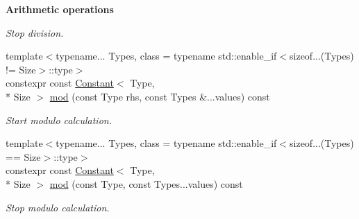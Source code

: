 \begin{Indent}{\bf Arithmetic operations}
\begin{DoxyCompactItemize}
\begin{DoxyCompactList}\small\item\em Stop division. \end{DoxyCompactList}\item 
{\footnotesize template$<$typename... Types, class  = typename std\-::enable\-\_\-if$<$sizeof...(\-Types) != Size$>$\-::type$>$ }\\constexpr const \hyperlink{exceptionmagrathea_1_1Constant}{Constant}$<$ Type, \\*
Size $>$ \hyperlink{exceptionmagrathea_1_1Constant_a8930610422c915ea40c9d33000b40c7a}{mod} (const Type rhs, const Types \&...values) const 
\begin{DoxyCompactList}\small\item\em Start modulo calculation. \end{DoxyCompactList}\item 
{\footnotesize template$<$typename... Types, class  = typename std\-::enable\-\_\-if$<$sizeof...(\-Types) == Size$>$\-::type$>$ }\\constexpr const \hyperlink{exceptionmagrathea_1_1Constant}{Constant}$<$ Type, \\*
Size $>$ \hyperlink{exceptionmagrathea_1_1Constant_a6fb7befad7f4909f9f1ae5722ccfb41a}{mod} (const Type, const Types...\-values) const 
\begin{DoxyCompactList}\small\item\em Stop modulo calculation. \end{DoxyCompactList}\end{DoxyCompactItemize}
\end{Indent}
